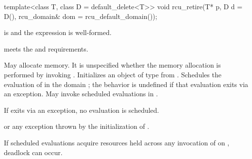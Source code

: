 \begin{itemdecl}
template<class T, class D = default_delete<T>>
void rcu_retire(T* p, D d = D(), rcu_domain& dom = rcu_default_domain());
\end{itemdecl}

\begin{itemdescr}

\pnum
\mandates
{} is  and
the expression  is well-formed.

\pnum
\expects
{} meets the  and
 requirements.

\pnum
\effects
May allocate memory.
It is unspecified whether the memory allocation is performed by
invoking  .
Initializes an object  of type  from
.
Schedules the evaluation of  in the domain
; the behavior is undefined if that evaluation
exits via an exception.
May invoke scheduled evaluations in .
\begin{note}
If  exits via an exception, no evaluation
is scheduled.
\end{note}

\pnum
\throws
{} or
any exception thrown by the initialization of .

\pnum
\begin{note}
If scheduled evaluations acquire resources held across any invocation
of  on , deadlock can occur.
\end{note}

\end{itemdescr}
